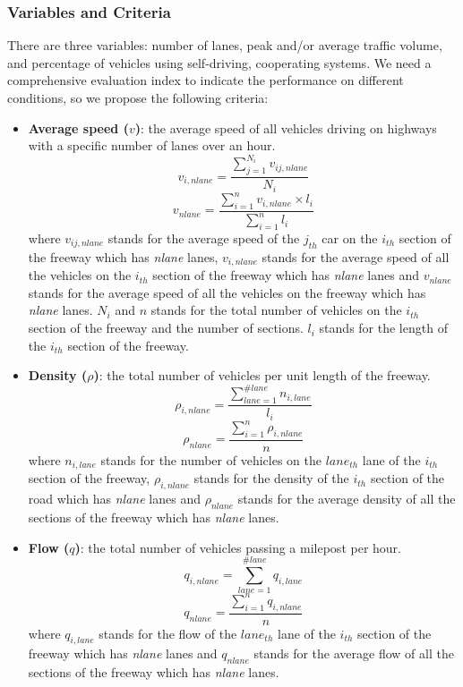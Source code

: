 \documentclass[a4paper]{article}
\begin{document}
	\subsubsection{Variables and Criteria}
	There are three variables: number of lanes, peak and/or average traffic volume, and percentage of vehicles using self-driving, cooperating systems. We need a comprehensive evaluation index to indicate the performance on different conditions, so we propose the following criteria:
	\begin{itemize}
		\item \textbf{Average speed ($v$)}: the average speed of all vehicles driving on highways with a specific number of lanes over an hour.
		$$v_{i,nlane}=\dfrac{\sum\limits_{j=1}^{N_i}v_{ij,nlane}}{{N_i}}$$
		$$v_{nlane}=\dfrac{\sum\limits_{i=1}^nv_{i,nlane}\times l_i}{\sum\limits_{i=1}^nl_i}$$
		where $v_{ij,nlane}$ stands for the average speed of the $j_{th}$ car on the $i_{th}$ section of the freeway which has \textit{nlane} lanes, $v_{i,nlane}$ stands for the average speed of all the vehicles on the $i_{th}$ section of the freeway which has \textit{nlane} lanes and $v_{nlane}$ stands for the average speed of all the vehicles on the freeway which has \textit{nlane} lanes. ${N_i}$ and $n$ stands for the total number of vehicles on the $i_{th}$ section of the freeway and the number of sections. $l_i$ stands for the length of the $i_{th}$ section of the freeway.
		
		\item \textbf{Density ($\rho$)}: the total number of vehicles per unit length of the freeway.
		$$\rho_{i,nlane}=\dfrac{\sum\limits_{lane=1}^{\#lane}n_{i,lane}}{l_i}$$
		$$\rho_{nlane}=\dfrac{\sum\limits_{i=1}^{n}\rho_{i,nlane}}{n}$$
		where $n_{i,lane}$ stands for the number of vehicles on the $lane_{th}$ lane of the $i_{th}$ section of the freeway, $\rho_{i,nlane}$ stands for the density of the $i_{th}$ section of the road which has \textit{nlane} lanes and $\rho_{nlane}$ stands for the average density of all the sections of the freeway which has \textit{nlane} lanes.
		
		\item \textbf{Flow ($q$)}: the total number of vehicles passing a milepost per hour.
		$$q_{i,nlane}=\sum\limits_{lane=1}^{\#lane}q_{i,lane}$$
		$$q_{nlane}=\dfrac{\sum\limits_{i=1}^{n}q_{i,nlane}}{n}$$
		where $q_{i,lane}$ stands for the flow of the $lane_{th}$ lane of the $i_{th}$ section of the freeway which has \textit{nlane} lanes and $q_{nlane}$ stands for the average flow of all the sections of the freeway which has \textit{nlane} lanes.
	\end{itemize}
	
\end{document}
